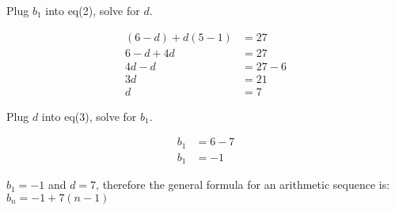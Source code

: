 \documentclass{article}
\begin{document}
\begin{itemize}
    Plug $b_1$ into eq(2), solve for $d$.
    
    \begin{align}
        (6-d)+d(5-1)&=27\nonumber\\
        6-d+4d&=27\nonumber\\
        4d-d&=27-6\nonumber\\
        3d&=21\nonumber\\
        d&=7\nonumber
    \end{align}
    
    Plug $d$ into eq(3), solve for $b_1$.
    
    \begin{align}
        b_1&=6-7\nonumber\\
        b_1&=-1\nonumber
    \end{align}
    
    {\color{blue} $b_1=-1$ and $d=7$, therefore the general formula for an arithmetic sequence is: $b_n=-1+7(n-1)$}
\end{itemize}
\end{document}
